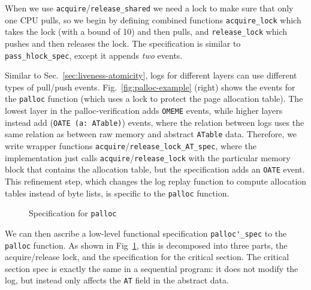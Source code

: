 When we use \lstinline$acquire$/\lstinline$release_shared$ we
need a lock to make sure that only one CPU pulls, so we begin
by defining combined functions \lstinline$acquire_lock$ which
takes the lock (with a bound of 10) and then pulls, and
\lstinline$release_lock$ which pushes and then releases the
lock. The specification is similar to \lstinline$pass_hlock_spec$,
except it appends \emph{two} events.

Similar to Sec.~\ref{sec:liveness-atomicity}, logs for different
layers can use different types of pull/push events.
Fig.~\ref{fig:palloc-example} (right) shows the events for the
\lstinline$palloc$ function (which uses a lock to protect the page
allocation table). The lowest layer in the palloc-verification adds
\lstinline$OMEME$ events, while higher layers instead add
(\lstinline$OATE (a: ATable)$) events, where the relation between logs
uses the same relation as between raw memory and abstract
\lstinline$ATable$ data. Therefore, we write wrapper functions
\lstinline$acquire$/\lstinline$release_lock_AT_spec$, where the
implementation just calls \lstinline$acquire$/\lstinline$release_lock$
with the particular memory block that contains the allocation table,
but the specification adds an \lstinline$OATE$ event.
This refinement step, which changes the log replay function to compute
allocation tables instead of byte lists, is
specific to the \lstinline$palloc$ function.

\begin{figure}




\caption{Specification for \lstinline$palloc$}
\label{fig:palloc-spec}
\end{figure}

We can then ascribe a low-level functional specification
\lstinline$palloc'_spec$ to the \lstinline$palloc$ function. As shown
in Fig~\ref{fig:palloc-spec}, this is decomposed into three parts, the
acquire/release lock, and the specification for the critical
section. The critical section spec is exactly the same in a sequential
program: it does not modify the log, but instead only affects the 
\lstinline$AT$ field in the abstract data.

